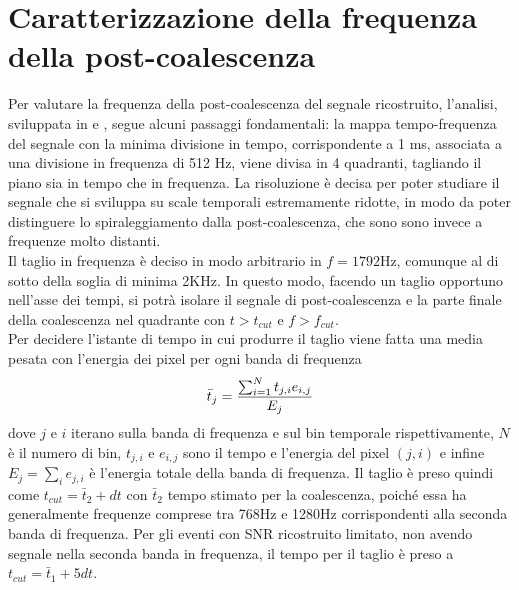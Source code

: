 \section{Caratterizzazione della frequenza della post-coalescenza}
\label{section:Frequenza_PM}
Per valutare la frequenza della post-coalescenza del segnale ricostruito, l'analisi, sviluppata in \cite{Puecher_2018} e \cite{Tringali_2017}, segue alcuni passaggi fondamentali:
la mappa tempo-frequenza del segnale con la minima divisione in tempo, corrispondente a 1 ms, associata a una divisione in frequenza di 512 Hz, viene divisa in 4 quadranti, tagliando il piano sia in tempo che in frequenza. La risoluzione è decisa per poter studiare il segnale che si sviluppa su scale temporali estremamente ridotte, in modo da poter distinguere lo spiraleggiamento dalla post-coalescenza, che sono sono invece a frequenze molto distanti.\\
Il taglio in frequenza è deciso in modo arbitrario in $f = 1792$Hz, comunque al di sotto della soglia di minima 2KHz. In questo modo, facendo un taglio opportuno nell'asse dei tempi, si potrà isolare il segnale di post-coalescenza e la parte finale della coalescenza nel quadrante con $t>t_{cut}$ e $f>f_{cut}$. \\ 
Per decidere l'istante di tempo in cui produrre il taglio viene fatta una media pesata con l'energia dei pixel per ogni banda di frequenza 
\begin{equation}
\vspace{-3pt}
\bar{t}_j = \frac{\sum_{i=1}^Nt_{j,i}e_{i,j}}{E_{j}}
\end{equation}
dove $j$ e $i$ iterano sulla banda di frequenza e sul bin temporale rispettivamente, $N$ è il numero di bin, $t_{j,i}$ e $e_{i,j}$ sono il tempo e l'energia del pixel $(j, i)$ e infine $E_{j} = \sum_{i}e_{j,i}$ è l'energia totale della banda di frequenza. Il taglio è preso quindi come $t_{cut} = \bar{t}_2 + dt$ con $\bar{t}_2$ tempo stimato per la coalescenza, poiché essa ha generalmente frequenze comprese tra 768Hz e 1280Hz corrispondenti alla seconda banda di frequenza. Per gli eventi con SNR ricostruito limitato, non avendo segnale nella seconda banda in frequenza, il tempo per il taglio è preso a $t_{cut} = \bar{t}_1 + 5dt$. \\
